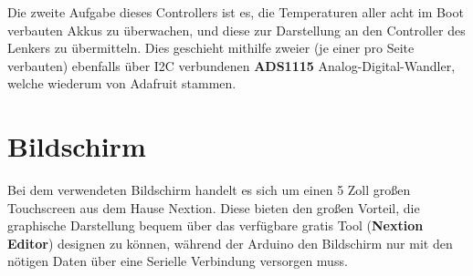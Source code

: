 Die zweite Aufgabe dieses Controllers ist es, die Temperaturen aller acht im Boot verbauten Akkus zu überwachen, und diese zur Darstellung an den Controller des Lenkers zu übermitteln.
Dies geschieht mithilfe zweier (je einer pro Seite verbauten) ebenfalls über I2C verbundenen \textbf{ADS1115} Analog-Digital-Wandler, welche wiederum von Adafruit stammen.  
\newpage
\section{Bildschirm}
Bei dem verwendeten Bildschirm handelt es sich um einen 5 Zoll großen Touchscreen aus dem Hause Nextion.
Diese bieten den großen Vorteil, die graphische Darstellung bequem über das verfügbare gratis Tool (\textbf{Nextion Editor}) designen zu können, während der Arduino den Bildschirm nur mit den nötigen Daten über eine Serielle Verbindung versorgen muss. 
